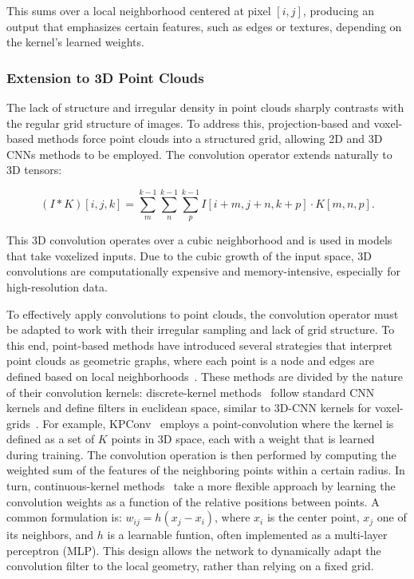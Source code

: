 This sums over a local neighborhood centered at pixel $[i, j]$, producing an
output that emphasizes certain features, such as edges or textures, depending
on the kernel's learned weights.

\subsubsection{Extension to 3D Point Clouds}

The lack of structure and irregular density in point clouds sharply contrasts
with the regular grid structure of images.
%
To address this, projection-based and voxel-based methods force point clouds
into a structured grid, allowing 2D and 3D CNNs methods to be employed.
%
The convolution operator extends naturally to 3D tensors:

\begin{equation}\label{eq:3d-discrete-conv}
    (I * K)[i, j, k] = \sum_{m}^{k-1} \sum_{n}^{k-1} \sum_{p}^{k-1} I[i + m, j + n, k + p] \cdot K[m,n,p].
\end{equation}

This 3D convolution operates over a cubic neighborhood and is used in models
that take voxelized inputs. Due to the cubic growth of the input space, 3D
convolutions are computationally expensive and memory-intensive, especially for
high-resolution data.
%

To effectively apply convolutions to point clouds, the convolution operator
must be adapted to work with their irregular sampling and lack of grid
structure.
%
To this end, point-based methods have introduced several strategies that
interpret point clouds as geometric graphs, where each point is a node and
edges are defined based on local
neighborhoods~\cite{hermosilla2018monte,simonovsky2017dynamic}.
%
These methods are divided by the nature of their convolution kernels:
%
discrete-kernel
methods~\cite{lei2019octree,thomas2019kpconv,lei2020spherical,zhu2021cylindrical,wang2019graph}
follow standard CNN kernels and define filters in euclidean space, similar to
3D-CNN kernels for voxel-grids~\cite{maturana2015voxnet}.
%
For example, KPConv~\cite{thomas2019kpconv} employs a point-convolution where
the kernel is defined as a set of $K$ points in 3D space, each with a weight
that is learned during training. The convolution operation is then performed by
computing the weighted sum of the features of the neighboring points within a
certain radius.
%
In turn, continuous-kernel
methods~\cite{groh2018flex,wang2018deep,xu2018spidercnn,li2018pointcnn,wu2019pointconv}
take a more flexible approach by learning the convolution weights as a function
of the relative positions between points. A common formulation is: $w_{ij} =
    h(x_j - x_i)$, where $x_i$ is the center point, $x_j$ one of its neighbors, and
$h$ is a learnable funtion, often implemented as a multi-layer perceptron
(MLP).
%
This design allows the network to dynamically adapt the convolution filter to
the local geometry, rather than relying on a fixed grid.
%

